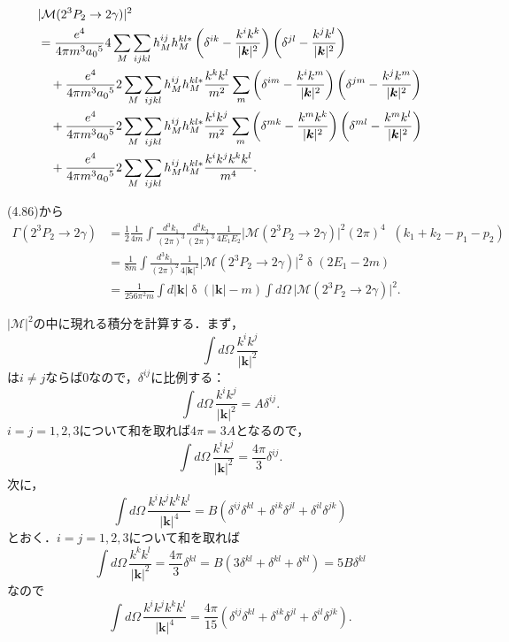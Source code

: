 \begin{align}
  & \lvert \mathcal{M}(2^3P_2 \to 2\gamma) \rvert^2 \notag \\
  &= \frac{e^4}{4\pi m^3 a_0{}^5} 4 \sum_M \sum_{ijkl} h_M^{ij} h_M^{kl\ast}
  \left( \delta^{ik} - \frac{k^ik^k}{\lvert\boldsymbol{k}\rvert^2} \right)
  \left( \delta^{jl} - \frac{k^jk^l}{\lvert\boldsymbol{k}\rvert^2} \right) \label{prob5_4b_23P2M2_1} \\
  &\quad + \frac{e^4}{4\pi m^3 a_0{}^5} 2 \sum_M \sum_{ijkl} h_M^{ij} h_M^{kl\ast} \frac{k^kk^l}{m^2}
  \sum_m \left( \delta^{im} - \frac{k^ik^m}{\lvert\boldsymbol{k}\rvert^2} \right)
  \left( \delta^{jm} - \frac{k^jk^m}{\lvert\boldsymbol{k}\rvert^2} \right) \label{prob5_4b_23P2M2_2} \\
  &\quad + \frac{e^4}{4\pi m^3 a_0{}^5} 2 \sum_M \sum_{ijkl} h_M^{ij} h_M^{kl\ast} \frac{k^ik^j}{m^2}
  \sum_m \left( \delta^{mk} - \frac{k^mk^k}{\lvert\boldsymbol{k}\rvert^2} \right)
  \left( \delta^{ml} - \frac{k^mk^l}{\lvert\boldsymbol{k}\rvert^2} \right) \label{prob5_4b_23P2M2_3} \\
  &\quad + \frac{e^4}{4\pi m^3 a_0{}^5} 2 \sum_M \sum_{ijkl} h_M^{ij} h_M^{kl\ast} \frac{k^ik^jk^kk^l}{m^4} \label{prob5_4b_23P2M2_4} .
\end{align}

(4.86)から
\begin{align*}
  \Gamma(2^3P_2 \to 2\gamma) &= \frac{1}{2} \frac{1}{4m} \int \frac{d^3k_1}{(2\pi)^3}\frac{d^3k_2}{(2\pi)^3} \frac{1}{4E_1E_2} \lvert \mathcal{M}(2^3P_2 \to 2\gamma) \rvert^2 (2\pi)^4 \mathop{\delta^{(4)}}(k_1+k_2-p_1-p_2) \\
  &= \frac{1}{8m} \int \frac{d^3k_1}{(2\pi)^2} \frac{1}{4\lvert \boldsymbol{k} \rvert^2}\lvert\mathcal{M}(2^3P_2 \to 2\gamma)\rvert^2 \mathop\delta(2E_1 - 2m) \\
  &= \frac{1}{256 \pi^2 m} \int d\lvert\boldsymbol{k}\rvert \mathop\delta(\lvert\boldsymbol{k}\rvert - m) \int d\Omega \, \lvert\mathcal{M}(2^3P_2 \to 2\gamma)\rvert^2 .
\end{align*}

$\lvert\mathcal{M}\rvert^2$の中に現れる積分を計算する．まず，
\[ \int d\Omega \, \frac{k^ik^j}{\lvert\boldsymbol{k}\rvert^2} \]
は$i \neq j$ならば$0$なので，$\delta^{ij}$に比例する：
\[ \int d\Omega \, \frac{k^ik^j}{\lvert\boldsymbol{k}\rvert^2} = A \delta^{ij} . \]
$i = j = 1, 2, 3$について和を取れば$4\pi = 3A$となるので，
\[ \int d\Omega \, \frac{k^ik^j}{\lvert\boldsymbol{k}\rvert^2} = \frac{4\pi}{3} \delta^{ij} . \]
次に，
\[ \int d\Omega \, \frac{k^ik^jk^kk^l}{\lvert\boldsymbol{k}\rvert^4} = B ( \delta^{ij}\delta^{kl} + \delta^{ik}\delta^{jl} + \delta^{il}\delta^{jk} ) \]
とおく．$i = j = 1, 2, 3$について和を取れば
\[
\int d\Omega \, \frac{k^kk^l}{\lvert\boldsymbol{k}\rvert^2} = \frac{4\pi}{3} \delta^{kl}
= B ( 3 \delta^{kl} + \delta^{kl} + \delta^{kl} ) = 5B\delta^{kl}
\]
なので
\[
\int d\Omega \, \frac{k^ik^jk^kk^l}{\lvert\boldsymbol{k}\rvert^4}
= \frac{4\pi}{15} ( \delta^{ij}\delta^{kl} + \delta^{ik}\delta^{jl} + \delta^{il}\delta^{jk} ) .
\]

